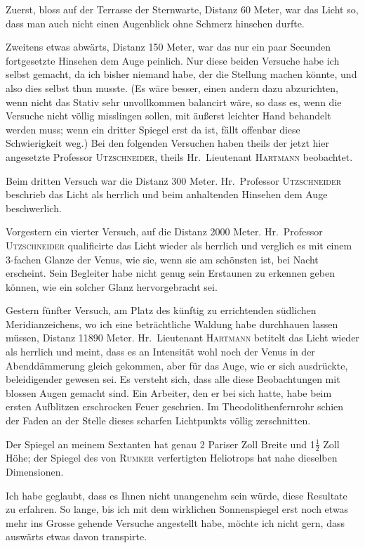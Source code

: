 \documentclass[12pt,a4paper]{article}
\theoremstyle{plain}
\theoremstyle{definition}
\theoremstyle{remark}
\begin{document}
Zuerst, bloss auf der Terrasse der Sternwarte, Distanz 60 Meter, war das Licht so, dass man auch nicht einen Augenblick ohne Schmerz hinsehen durfte.

Zweitens etwas abw\"arts, Distanz 150 Meter, war das nur ein paar Secunden fortgesetzte Hinsehen dem Auge peinlich. Nur diese beiden Versuche habe ich selbst gemacht, da ich bisher niemand habe, der die Stellung machen k\"onnte, und also dies selbst thun musste. (Es w\"are besser, einen andern dazu abzurichten, wenn nicht das Stativ sehr unvollkommen balancirt w\"are, so dass es, wenn die Versuche nicht v\"ollig misslingen sollen, mit \"au\ss erst leichter Hand behandelt werden muss; wenn ein dritter Spiegel erst da ist, f\"allt offenbar diese Schwierigkeit weg.) Bei den folgenden Versuchen haben theils der jetzt hier angesetzte Professor \textsc{Utzschneider}, theils Hr.\ Lieutenant \textsc{Hartmann} beobachtet.

Beim dritten Versuch war die Distanz 300 Meter. Hr.\ Professor \textsc{Utzschneider} beschrieb das Licht als herrlich und beim anhaltenden Hinsehen dem Auge beschwerlich.

Vorgestern ein vierter Versuch, auf die Distanz 2000 Meter. Hr.\ Professor \textsc{Utzschneider} qualificirte das Licht wieder als herrlich und verglich es mit einem 3-fachen Glanze der Venus, wie sie, wenn sie am sch\"onsten ist, bei Nacht erscheint. Sein Begleiter habe nicht genug sein Erstaunen zu erkennen geben k\"onnen, wie ein solcher Glanz hervorgebracht sei.

Gestern f\"unfter Versuch, am Platz des k\"unftig zu errichtenden s\"udlichen Meridianzeichens, wo ich eine betr\"achtliche Waldung habe durchhauen lassen m\"ussen, Distanz 11890 Meter. Hr.\ Lieutenant \textsc{Hartmann} betitelt das Licht wieder als herrlich und meint, dass es an Intensit\"at wohl noch der Venus in der Abendd\"ammerung gleich gekommen, aber f\"ur das Auge, wie er sich ausdr\"uckte, beleidigender gewesen sei. Es versteht sich, dass alle diese Beobachtungen mit blossen Augen gemacht sind. Ein Arbeiter, den er bei sich hatte, habe beim ersten Aufblitzen erschrocken Feuer geschrien. Im Theodolithenfernrohr schien der Faden an der Stelle dieses scharfen Lichtpunkts v\"ollig zerschnitten.

Der Spiegel an meinem Sextanten hat genau 2 Pariser Zoll Breite und 1$\tfrac12$ Zoll H\"ohe; der Spiegel des von \textsc{Rumker} verfertigten Heliotrops hat nahe dieselben Dimensionen.

Ich habe geglaubt, dass es Ihnen nicht unangenehm sein w\"urde, diese Resultate zu erfahren. So lange, bis ich mit dem wirklichen Sonnenspiegel erst noch etwas mehr ins Grosse gehende Versuche angestellt habe, m\"ochte ich nicht gern, dass ausw\"arts etwas davon transpirte.
\end{document}
